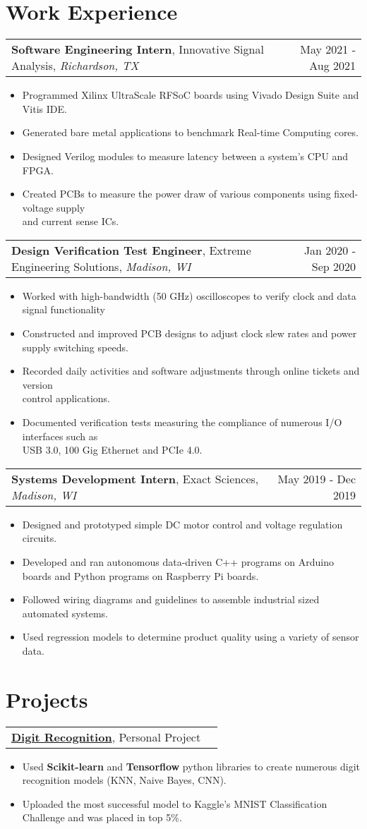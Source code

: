 \documentclass[letterpaper,11pt]{article}
\makeatletter
\newcommand{\exptitle}[4]{
  \vspace{7pt}
  \begin{tabular*}{1.00\textwidth}[t]{l@{\extracolsep{\fill}}r}
    \textbf{#1}, #2, \textit{#3} & #4 \\
  \end{tabular*}\vspace{-5pt}
}
\newcommand{\projtitle}[2]{
  \vspace{7pt}
  \begin{tabular*}{1.00\textwidth}[t]{l@{\extracolsep{\fill}}r}
    \textbf{#1}, #2 \\
  \end{tabular*}\vspace{-5pt}
}
\newcommand{\expstart}{\begin{itemize}[leftmargin=5mm]}
\newcommand{\expend}{\end{itemize}\vspace{-5pt}}
\newcommand{\expitem}[1]{\item\small{{#1 \vspace{-5pt}}}}
\makeatother
\begin{document}
\section{Work 
Experience}
 \vspace{-6pt}
  \exptitle{Software Engineering Intern}{Innovative Signal Analysis}{Richardson, TX}{May 2021 - Aug 2021}
  \expstart
    \expitem{Programmed Xilinx UltraScale RFSoC boards using Vivado Design Suite and Vitis IDE.}
    \expitem{Generated bare metal applications to benchmark Real-time Computing cores.}
    \expitem{Designed Verilog modules to measure latency between a system’s CPU and FPGA.}
    \expitem{Created PCBs to measure the power draw of various components using fixed-voltage supply \\ and current sense ICs.}
  \expend
  
  \exptitle{Design Verification Test Engineer}{Extreme Engineering Solutions}{Madison, WI}{Jan 2020 - Sep 2020}
  \expstart
    \expitem{Worked with high-bandwidth (50 GHz) oscilloscopes to verify clock and data signal functionality}
    \expitem{Constructed and improved PCB designs to adjust clock slew rates and power supply switching speeds.}
    \expitem{Recorded daily activities and software adjustments through online tickets and version \\ control applications.}
    \expitem{Documented verification tests measuring the compliance of numerous I/O interfaces such as \\ USB 3.0, 100 Gig Ethernet and PCIe 4.0.}
  \expend
  
  \exptitle{Systems Development Intern}{Exact Sciences}{Madison, WI}{May 2019 - Dec 2019}
  \expstart
    \expitem{Designed and prototyped simple DC motor control and voltage regulation circuits.}
    \expitem{Developed and ran autonomous data-driven C++ programs on Arduino \\ boards and Python programs on Raspberry Pi boards.}
    \expitem{Followed wiring diagrams and guidelines to assemble industrial sized automated systems.}
    \expitem{Used regression models to determine product quality using a variety of sensor data.}
  \expend

\section{Projects}
  \vspace{-6pt}
  \projtitle{\href{https://github.com/jth1011/Digit-Recognizer}{Digit Recognition}}{Personal Project}
  \expstart
    \expitem{Used \textbf{Scikit-learn} and \textbf{Tensorflow} python libraries to create numerous digit recognition models (KNN, Naive Bayes, CNN).}
    \expitem{Uploaded the most successful model to Kaggle's MNIST Classification Challenge and was placed in top 5\%.}
  \expend
  
\end{document}
